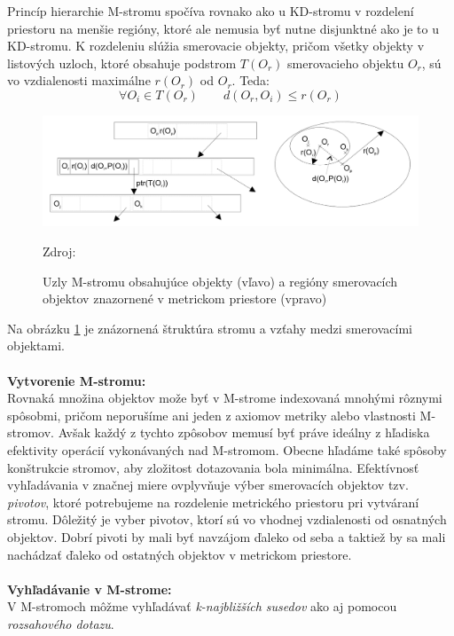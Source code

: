 \documentclass[12pt,oneside]{fithesis2}
\begin{document}
Princíp hierarchie M-stromu spočíva rovnako ako u KD-stromu v rozdelení priestoru na menšie regióny, ktoré ale nemusia byť nutne disjunktné ako je to u KD-stromu. K rozdeleniu slúžia smerovacie objekty, pričom všetky objekty v listových uzloch, ktoré obsahuje podstrom $T(O_r)$ smerovacieho objektu $O_r$, sú vo vzdialenosti maximálne $r(O_r)$ od $O_r$. Teda:
\begin{equation*}
\forall O_i \in T(O_r) \qquad   d(O_r,O_i) \leq r(O_r)
\end{equation*}
\begin{figure}
  		\centering
  		\includegraphics[width=13cm]{obr/m-tree.png}
  		\caption{Uzly M-stromu obsahujúce objekty (vľavo) a regióny smerovacích objektov znazornené v metrickom priestore (vpravo)} Zdroj: \cite{stromy} 
  		\label{m-strom}
\end{figure}
Na obrázku \ref{m-strom} je znázornená štruktúra stromu a vzťahy medzi smerovacími objektami.\\
\\
\textbf{Vytvorenie M-stromu:}\\
Rovnaká množina objektov može byť v M-strome indexovaná mnohými rôznymi spôsobmi, pričom neporušíme ani jeden z axiomov metriky alebo vlastnosti M-stromov. Avšak každý z tychto zpôsobov memusí byť práve ideálny z hľadiska efektivity operácií vykonávaných nad M-stromom. Obecne hľadáme také spôsoby konštrukcie stromov, aby zložitost dotazovania bola minimálna. Efektívnosť vyhľadávania v značnej miere ovplyvňuje výber smerovacích objektov tzv. \textit{pivotov}, ktoré potrebujeme na rozdelenie metrického priestoru pri vytváraní stromu. Dôležitý je vyber pivotov, ktorí sú vo vhodnej vzdialenosti od osnatných objektov. Dobrí pivoti by mali byť navzájom ďaleko od seba a taktiež by sa mali nachádzať ďaleko od ostatných objektov v metrickom priestore. \\
\\
\textbf{Vyhľadávanie v M-strome:}\\
V M-stromoch môžme vyhľadávať \textit{k-najbližších susedov} ako aj pomocou \textit{rozsahového dotazu}. 
\end{document}
